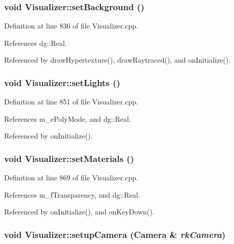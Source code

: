 \subsubsection{\setlength{\rightskip}{0pt plus 5cm}void Visualizer::set\-Background ()\hspace{0.3cm}{\tt  [protected]}}\label{classdg_1_1Visualizer_b5}




Definition at line 836 of file Visualizer.cpp.

References dg::Real.

Referenced by draw\-Hypertexture(), draw\-Raytraced(), and on\-Initialize().
\subsubsection{\setlength{\rightskip}{0pt plus 5cm}void Visualizer::set\-Lights ()\hspace{0.3cm}{\tt  [protected]}}\label{classdg_1_1Visualizer_b6}




Definition at line 851 of file Visualizer.cpp.

References m\_\-e\-Poly\-Mode, and dg::Real.

Referenced by on\-Initialize().
\subsubsection{\setlength{\rightskip}{0pt plus 5cm}void Visualizer::set\-Materials ()\hspace{0.3cm}{\tt  [protected]}}\label{classdg_1_1Visualizer_b7}




Definition at line 869 of file Visualizer.cpp.

References m\_\-f\-Transparency, and dg::Real.

Referenced by on\-Initialize(), and on\-Key\-Down().
\subsubsection{\setlength{\rightskip}{0pt plus 5cm}void Visualizer::setup\-Camera ({\bf Camera} \& {\em rk\-Camera})\hspace{0.3cm}{\tt  [protected]}}\label{classdg_1_1Visualizer_b3}




